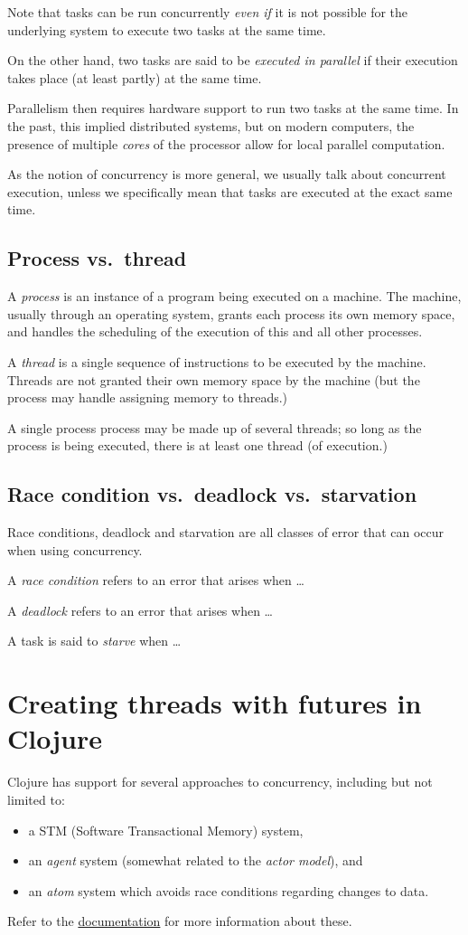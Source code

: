 \documentclass[11pt]{article}
\begin{document}
Note that tasks can be run concurrently \emph{even if} it is not possible
for the underlying system to execute two tasks at the same time.

On the other hand, two tasks are said to be \emph{executed in parallel} if
their execution takes place (at least partly) at the same time.

Parallelism then requires hardware support
to run two tasks at the same time.
In the past, this implied distributed systems, but on modern computers,
the presence of multiple \emph{cores} of the processor allow for
local parallel computation.

As the notion of concurrency is more general,
we usually talk about concurrent execution,
unless we specifically mean that tasks are executed at
the exact same time.

\subsection{Process vs. thread}
\label{sec:orgcf261a6}
A \emph{process} is an instance of a program being executed on a machine.
The machine, usually through an operating system,
grants each process its own memory space, and
handles the scheduling of the execution of this and all other processes.

A \emph{thread} is a single sequence of instructions to be executed
by the machine. Threads are not granted their own memory space
by the machine (but the process may handle assigning memory to threads.)

A single process process may be made up of several threads;
so long as the process is being executed, there is at least
one thread (of execution.)

\subsection{Race condition vs. deadlock vs. starvation}
\label{sec:orga3c5c05}
Race conditions, deadlock and starvation are all classes of error
that can occur when using concurrency.

A \emph{race condition} refers to an error that arises when …

A \emph{deadlock} refers to an error that arises when …

A task is said to \emph{starve} when …

\section{Creating threads with futures in Clojure}
\label{sec:org50e780e}
Clojure has support for several approaches to concurrency,
including but not limited to:
\begin{itemize}
\item a STM (Software Transactional Memory) system,
\item an \emph{agent} system (somewhat related to the \emph{actor model}), and
\item an \emph{atom} system which avoids race conditions
regarding changes to data.
\end{itemize}
Refer to the \href{https://clojure.org/about/concurrent\_programming}{documentation}
for more information about these.
\end{document}
